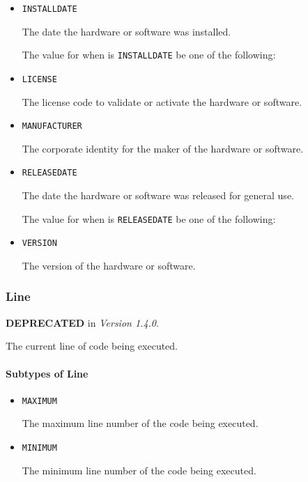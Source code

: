 \begin{itemize}

\item \texttt{INSTALL\textunderscore DATE}


The date the hardware or software was installed.


The value for  when  is \texttt{INSTALL\textunderscore DATE} \MUST be one of the following: 

\item \texttt{LICENSE}


The license code to validate or activate the hardware or software.

\item \texttt{MANUFACTURER}


The corporate identity for the maker of the hardware or software.


\item \texttt{RELEASE\textunderscore DATE}


The date the hardware or software was released for general use.



The value for  when  is \texttt{RELEASE\textunderscore DATE} \MUST be one of the following: 

\item \texttt{VERSION}


The version of the hardware or software.


\end{itemize}








\subsubsection{Line}
\label{sec:Line}



\textbf{DEPRECATED} in \textit{Version 1.4.0}.

The current line of code being executed.


\paragraph{Subtypes of Line}\mbox{}
\label{sec:Subtypes of Line}

\begin{itemize}

\item \texttt{MAXIMUM}


The maximum line number of the code being executed.

\item \texttt{MINIMUM}


The minimum line number of the code being executed.


\end{itemize}





